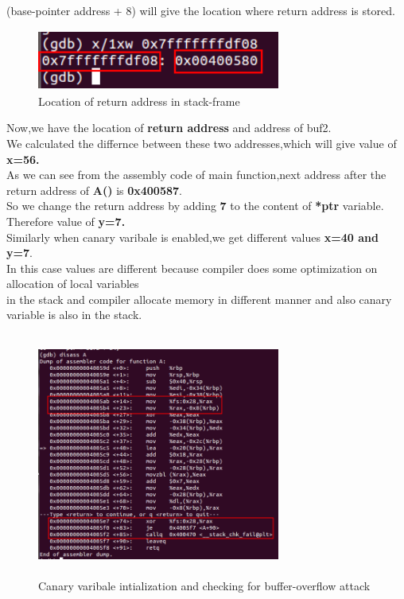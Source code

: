 \documentclass{article}
\begin{document}
         (base-pointer address + 8) will give the location where return address is stored.\\
          
           \begin{figure}[H]
             \begin{center}
		\includegraphics[width=8cm,height=2cm]{ret.png}
	\caption{Location of return address in stack-frame}
	\end{center}
	\end{figure}
         
         Now,we have the location of \textbf{return address} and address of buf2.\\
         We calculated the differnce between these two
         addresses,which will give value of \textbf{x=56.}\\
         As we can see from the assembly code of main function,next address after the return address of \textbf{A()} is \textbf{0x400587}.\\
          So we change the return address by adding \textbf{7} to the content of \textbf{*ptr} variable.\\
          Therefore value of \textbf{y=7.}\\
          
          Similarly when canary varibale is enabled,we get different values \textbf{x=40 and y=7}.\\
          In this case values are different because compiler does some optimization on allocation of local variables\\
           in the stack and compiler allocate memory in different manner and also canary variable is also in the stack.\\
           
           \begin{figure}[H]
             \begin{center}
		\includegraphics[width=8cm,height=8cm]{can.png}
	\caption{Canary varibale intialization and checking for buffer-overflow attack}
	\end{center}
	\end{figure}
         
\end{document}
